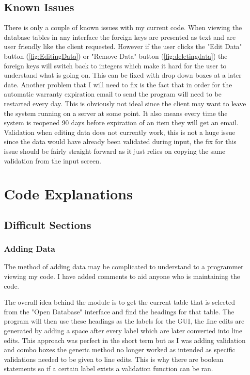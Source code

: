 \subsection{Known Issues}

There is only a couple of known issues with my current code. When viewing the database tables in any interface the foreign keys are presented as text and are user friendly like the client requested. However if the user clicks the "Edit Data" button (\ref{fig:EditingData}) or "Remove Data" button (\ref{fig:deletingdata}) the foreign keys will switch back to integers which make it hard for the user to understand what is going on. This can be fixed with drop down boxes at a later date. Another problem that I will need to fix is the fact that in order for the automatic warranty expiration email to send the program will need to be restarted every day. This is obviously not ideal since the client may want to leave the system running on a server at some point. It also means every time the system is reopened 90 days before expiration of an item they will get an email. Validation when editing data does not currently work, this is not a huge issue since the data would have already been validated during input, the fix for this issue should be fairly straight forward as it just relies on copying the same validation from the input screen.

\section{Code Explanations}

\subsection{Difficult Sections}

\subsubsection{Adding Data}

The method of adding data may be complicated to understand to a programmer viewing my code. I have added comments to aid anyone who is maintaining the code.

The overall idea behind the module is to get the current table that is selected from the  "Open Database" interface and find the headings for that table. The program will then use these headings as the labels for the GUI, the line edits are generated by adding a space after every label which are later converted into line edits. This approach was perfect in the short term but as I was adding validation and combo boxes the generic method no longer worked as intended as specific validations needed to be given to line edits. This is why there are boolean statements so if a certain label exists a validation function can be ran.


